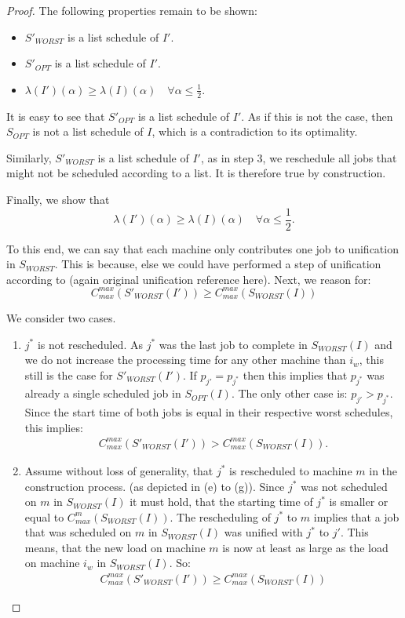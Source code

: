 \documentclass[11pt]{article}
\begin{document}
\begin{proof}
The following properties remain to be shown: 
\begin{itemize}
    \item $S'_{WORST}$ is a list schedule of $I'$.
    \item $S'_{OPT}$ is a list schedule of $I'$.
    \item $\lambda(I')(\alpha) \geq \lambda(I)(\alpha) \quad \forall \alpha \leq \frac{1}{2}$.
\end{itemize}

It is easy to see that $S'_{OPT}$ is a list schedule of $I'$. 
As if this is not the case, then $S_{OPT}$ is not a list schedule of $I$, which is a contradiction to 
its optimality. 

Similarly, $S'_{WORST}$ is a list schedule of $I'$, as in step 3, we reschedule all jobs that might not be scheduled
according to a list. It is therefore true by construction. 



Finally, we show that 
\[
    \lambda(I')(\alpha) \geq \lambda(I)(\alpha) \quad \forall \alpha \leq \frac{1}{2}.
\]

To this end, we can say that each machine only contributes one job to unification
in $S_{WORST}$. This is because, else we could have performed a step of unification according to
(again original unification reference here).
Next, we reason for:  
\[
C_{max}^{max}(S'_{WORST}(I')) \geq C_{max}^{max}(S_{WORST}(I))
\]

We consider two cases. 
\begin{enumerate}
    \item   $j^*$ is not rescheduled. As $j^*$ was the last job to complete in $S_{WORST}(I)$ and we do not 
            increase the processing time for any other machine than $i_{w}$, this still is the case for $S'_{WORST}(I')$. 
            If $p_{j'} = p_{j^*}$ then this implies that $p_{j^*}$ was already a single scheduled job in $S_{OPT}(I)$. 
            The only other case is: $p_{j'}  > p_{j^*}$. Since the start time of both jobs is equal in their respective worst 
            schedules, this implies: 
            \begin{align*}
            C_{max}^{max}(S'_{WORST}(I'))>C_{max}^{max}(S_{WORST}(I)).
            \end{align*}
    \item  Assume without loss of generality, that $j^{*}$ is rescheduled to machine $m$ in the construction process.
            (as depicted in (e) to (g)). Since $j^{*}$  was not scheduled on $m$ in $S_{WORST}(I)$ it must hold, that the starting time 
            of $j^*$ is smaller or equal to $C^{m}_{max}(S_{WORST}(I))$. The rescheduling of $j^{*}$ to $m$ implies that a job
            that was scheduled on $m$ in $S_{WORST}(I)$ was unified with $j^*$ to $j'$. This means, that the new load on machine $m$ is now at least as
            large as the load on machine $i_{w}$ in $S_{WORST}(I)$. So: 
            \begin{align*}
            C_{max}^{max}(S'_{WORST}(I')) \ge C_{max}^{max}(S_{WORST}(I))
            \end{align*}
\end{enumerate}



\end{proof}
\end{document}
